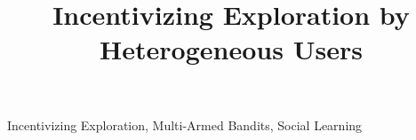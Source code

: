 \documentclass[twoside,11pt]{article}
\begin{document}
\title{Incentivizing Exploration by Heterogeneous Users}


\editor{}

\maketitle

\begin{abstract}

\end{abstract}

\begin{keywords}
Incentivizing Exploration, Multi-Armed Bandits, Social Learning
\end{keywords}

     



















\newpage

\appendix







% 


\end{document}
